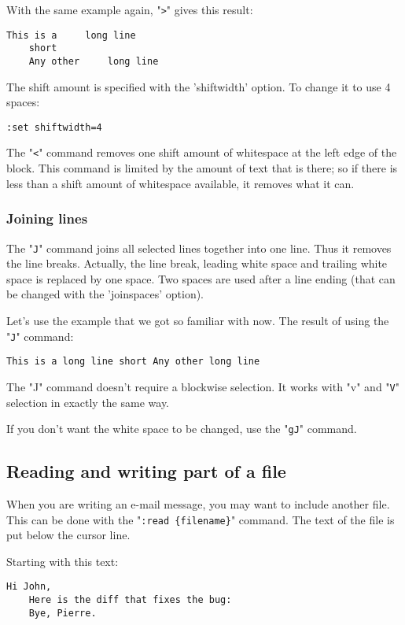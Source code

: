 With the same example again, "\verb!>!" gives this result:

\begin{Verbatim}[samepage=true]
    This is a     long line 
    short 
    Any other     long line 
\end{Verbatim}

The shift amount is specified with the 'shiftwidth' option.
To change it to use 4 spaces:

\begin{Verbatim}[samepage=true]
 :set shiftwidth=4
\end{Verbatim}

The "\verb!<!" command removes one shift amount of whitespace at the left edge of the block.
This command is limited by the amount of text that is there; so if there is less than a shift amount of whitespace available, it removes what it can.


\subsubsection{Joining lines}
The "\verb!J!" command joins all selected lines together into one line.
Thus it removes the line breaks.
Actually, the line break, leading white space and trailing white space is replaced by one space.
Two spaces are used after a line ending (that can be changed with the 'joinspaces' option).

Let's use the example that we got so familiar with now.
The result of using the "\verb!J!" command:

\begin{Verbatim}[samepage=true]
    This is a long line short Any other long line 
\end{Verbatim}

The "J" command doesn't require a blockwise selection.
It works with "v" and "\verb!V!" selection in exactly the same way.

If you don't want the white space to be changed, use the "\verb!gJ!" command.
\subsection{Reading and writing part of a file}
When you are writing an e-mail message, you may want to include another file.
This can be done with the "\verb!:read {filename}!" command.
The text of the file is put below the cursor line.

Starting with this text:

\begin{Verbatim}[samepage=true]
    Hi John, 
    Here is the diff that fixes the bug: 
    Bye, Pierre. 
\end{Verbatim}

